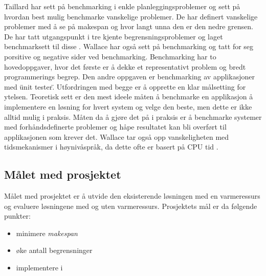 Taillard har sett på benchmarking i enkle planleggingsproblemer og sett på hvordan best mulig benchmarke vanskelige problemer. De har definert vanskelige problemer med å se på makespan og hvor langt unna den er den nedre grensen. De har tatt utgangspunkt i tre kjente begrensningsproblemer og laget benchmarksett til disse \cite{Taillard1993278}. Wallace har også sett på benchmarking og tatt for seg porsitive og negative sider ved benchmarking. Benchmarking har to hovedoppgaver, hvor det første er å dekke et representativt problem og bredt programmerings begrep. Den andre oppgaven er benchmarking av applikasjoner med \"unit tester\". Utfordringen med begge er å opprette en klar målsetting for ytelsen. Teoretisk sett er den mest ideele måten å benchmarke en applikasjon å implementere en løsning for hvert system og velge den beste, men dette er ikke alltid mulig i praksis. Måten da å gjøre det på i praksis er å benchmarke systemer med forhåndsdefinerte problemer og håpe resultatet kan bli overført til applikasjonen som krever det. Wallace tar også opp vanskeligheten med tidsmekanismer i høynivåspråk, da dette ofte er basert på CPU tid \cite{Wallace:2004:BCL:956860.956861}.
\begin{comment}
\begin{itemize}
\item (Laborie) IBM ILOG CP Optimizer for Detailed Scheduling Illustrated in Three problems \cite{Laborie:2009:IIC:1560579.1560593}
\begin{itemize}
\item ...
\end{itemize}

\item (Biskup) Enslig-maskin planlegging med læringsbetraktninger %
\begin{itemize}
\item \dots
\end{itemize}

\end{itemize}
\end{comment}

\subsection{Målet med prosjektet}
Målet med prosjektet er å utvide den eksisterende \ilog løsningen med en varmeressurs og evaluere løsningene med og uten varmeressurs. Prosjektets mål er da følgende punkter:
\begin{itemize}
\item minimere \textit{makespan}
\item øke antall begrensninger
\item implementere i \ilog
\end{itemize}

